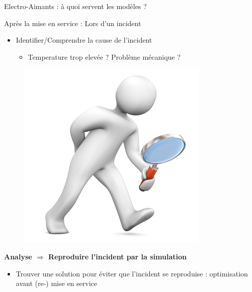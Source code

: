 \begin{frame}{Electro-Aimants : à quoi servent les modèles ?}
  \begin{block}{Après la mise en service : Lors d'un incident}
    \begin{small}
      \begin{itemize}
      \item Identifier/Comprendre la cause de l'incident
        \begin{itemize}
        \item Temperature trop elevée ? Problème mécanique ?
        \end{itemize}
      \end{itemize}
      \begin{figure}[H]
        \centering
        \includegraphics[scale=0.15]{Figures/cmi/loupe.jpg}
      \end{figure}
    \end{small}
    \vspace*{-0.4cm}
    \begin{center} \textbf{Analyse $\Rightarrow$ Reproduire l'incident par la simulation} \end{center}
    \vspace*{-0.4cm}
    \begin{small}
      \begin{itemize}
      \item Trouver une solution pour éviter que l'incident se reproduise : optimisation avant (re-) mise en service
      \end{itemize}
    \end{small}
  \end{block}
\end{frame}

